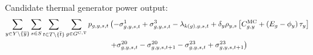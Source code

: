 \documentclass{article}
\begin{document}

Candidate thermal generator power output:
\begin{align}
\sum\limits_{\iYear \in \sYears 
	\setminus \{\iYearTerminal\}
}\sum\limits_{\iScenario \in \sScenarios}\sum\limits_{\iInterval \in \sIntervals \setminus \{\iIntervalTerminal\}} \sum\limits_{\iGenerator \in \sGeneratorsCandidateThermal} \vPower &\left( -\dMinPowerOutput + \dMaxPowerOutputCandidateThermal 
- \dPowerBalance[k(\iGenerator),\iYear,\iScenario,\iInterval] + \cDiscountRate \cScenarioDuration \left[\cMarginalCost + \left(\cEmissionsIntensity - \vBaseline\right)\vPermitPrice \right] \right. \nonumber\\
& \left. + \dRampRateUp - \dRampRateUp[\iGenerator,\iYear,\iScenario,\iInterval + 1] - \dRampRateDown + \dRampRateDown[\iGenerator,\iYear,\iScenario,\iInterval + 1]
\right)\\\nonumber
\end{align}
\end{document}
